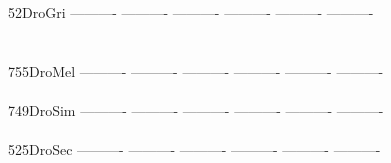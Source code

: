 \documentclass[11pt,twoside,reqno,a4paper]{article}
\begin{document}
{52\hspace*{3\charwidth}DroGri	----------	----------	----------	----------	----------	----------	\\
\hspace*{5\charwidth}\hspace*{7\charwidth}\hspace*{1\charwidth}\hspace*{1\charwidth}\hspace*{1\charwidth}\hspace*{1\charwidth}\hspace*{1\charwidth}\hspace*{1\charwidth}\\
\\
755\hspace*{2\charwidth}DroMel	----------	----------	----------	----------	----------	----------	\\
\hspace*{5\charwidth}\hspace*{7\charwidth}\hspace*{1\charwidth}\hspace*{1\charwidth}\hspace*{1\charwidth}\hspace*{1\charwidth}\hspace*{1\charwidth}\hspace*{1\charwidth}\\
749\hspace*{2\charwidth}DroSim	----------	----------	----------	----------	----------	----------	\\
\hspace*{5\charwidth}\hspace*{7\charwidth}\hspace*{1\charwidth}\hspace*{1\charwidth}\hspace*{1\charwidth}\hspace*{1\charwidth}\hspace*{1\charwidth}\hspace*{1\charwidth}\\
525\hspace*{2\charwidth}DroSec	----------	----------	----------	----------	----------	----------	\\
\hspace*{5\charwidth}\hspace*{7\charwidth}\hspace*{1\charwidth}\hspace*{1\charwidth}\hspace*{1\charwidth}\hspace*{1\charwidth}\hspace*{1\charwidth}\hspace*{1\charwidth}\\
}
\end{document}
